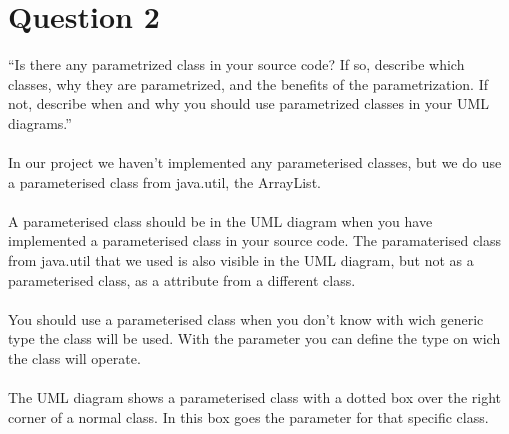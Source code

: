 \section{Question 2}

``Is there any parametrized class in your source code? If so, describe which classes, why they are
parametrized, and the benefits of the parametrization. If not, describe when and why you should use
parametrized classes in your UML diagrams.''
\\
\\
In our project we haven't implemented any parameterised classes, but we do use a parameterised class from java.util, the ArrayList. \\
\\
A parameterised class should be in the UML diagram when you have implemented a parameterised class in your source code. The paramaterised class from java.util that we used is also visible in the UML diagram, but not as a parameterised class, as a attribute from a different class.\\
\\
You should use a parameterised class when you don't know with wich generic type the class will be used. With the parameter you can define the type on wich the class will operate.\\
\\
The UML diagram shows a parameterised class with a dotted box over the right corner of a normal class. In this box goes the parameter for that specific class. 